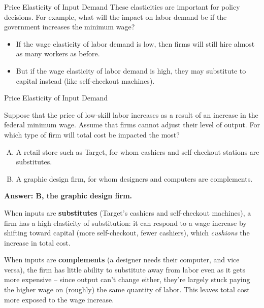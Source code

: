\documentclass{beamer}
\begin{document}
\begin{frame}{Price Elasticity of Input Demand}
  These elasticities are important for policy decisions. For example, what will the impact on labor demand be if the government increases the minimum wage?
  
  \begin{itemize}
    \item If the wage elasticity of labor demand is low, then firms will still hire almost as many workers as before. 
    
    \item But if the wage elasticity of labor demand is high, they may substitute to capital instead (like self-checkout machines).
  \end{itemize}
\end{frame}

\begin{frame}{Price Elasticity of Input Demand}

  \bigskip
  Suppose that the price of low-skill labor increases as a result of an increase in the federal minimum wage. Assume that firms cannot adjust their level of output. For which type of firm will total cost be impacted the most?

  \bigskip
  \begin{enumerate}[A)]
    \item A retail store such as Target, for whom cashiers and self-checkout stations are substitutes.
    \item A graphic design firm, for whom designers and computers are complements.
  \end{enumerate}
\end{frame}

\begin{frame}

  \bigskip
  \textbf{Answer: B, the graphic design firm.}

  \bigskip
  When inputs are \textbf{substitutes} (Target's cashiers and self-checkout machines), a firm has a high elasticity of substitution: it can respond to a wage increase by shifting toward capital (more self-checkout, fewer cashiers), which \emph{cushions} the increase in total cost.

  \bigskip
  When inputs are \textbf{complements} (a designer needs their computer, and vice versa), the firm has little ability to substitute away from labor even as it gets more expensive -- since output can't change either, they're largely stuck paying the higher wage on (roughly) the same quantity of labor. This leaves total cost more exposed to the wage increase.
\end{frame}
\end{document}
